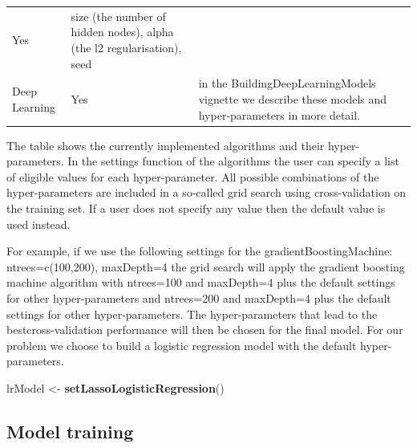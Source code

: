 \documentclass[]{article}
\newenvironment{Shaded}{\begin{snugshade}}{\end{snugshade}}
\newcommand{\KeywordTok}[1]{\textcolor[rgb]{0.13,0.29,0.53}{\textbf{#1}}}
\newcommand{\StringTok}[1]{\textcolor[rgb]{0.31,0.60,0.02}{#1}}
\newcommand{\NormalTok}[1]{#1}
\begin{document}
\begin{longtable}[]{@{}lll@{}}
\begin{minipage}[t]{0.08\columnwidth}
Yes\strut
\end{minipage} & \begin{minipage}[t]{0.48\columnwidth}\raggedright\strut
size (the number of hidden nodes), alpha (the l2 regularisation),
seed\strut
\end{minipage}\tabularnewline
\begin{minipage}[t]{0.35\columnwidth}\raggedright\strut
Deep Learning\strut
\end{minipage} & \begin{minipage}[t]{0.08\columnwidth}\raggedright\strut
Yes\strut
\end{minipage} & \begin{minipage}[t]{0.48\columnwidth}\raggedright\strut
in the BuildingDeepLearningModels vignette we describe these models and
hyper-parameters in more detail.\strut
\end{minipage}\tabularnewline
\bottomrule
\end{longtable}

The table shows the currently implemented algorithms and their
hyper-parameters. In the settings function of the algorithms the user
can specify a list of eligible values for each hyper-parameter. All
possible combinations of the hyper-parameters are included in a
so-called grid search using cross-validation on the training set. If a
user does not specify any value then the default value is used instead.

For example, if we use the following settings for the
gradientBoostingMachine: ntrees=c(100,200), maxDepth=4 the grid search
will apply the gradient boosting machine algorithm with ntrees=100 and
maxDepth=4 plus the default settings for other hyper-parameters and
ntrees=200 and maxDepth=4 plus the default settings for other
hyper-parameters. The hyper-parameters that lead to the
bestcross-validation performance will then be chosen for the final
model. For our problem we choose to build a logistic regression model
with the default hyper-parameters.

\begin{Shaded}
\begin{Highlighting}[]
\NormalTok{lrModel <-}\StringTok{ }\KeywordTok{setLassoLogisticRegression}\NormalTok{()}
\end{Highlighting}
\end{Shaded}

\subsection{Model training}\label{model-training}
\end{document}
